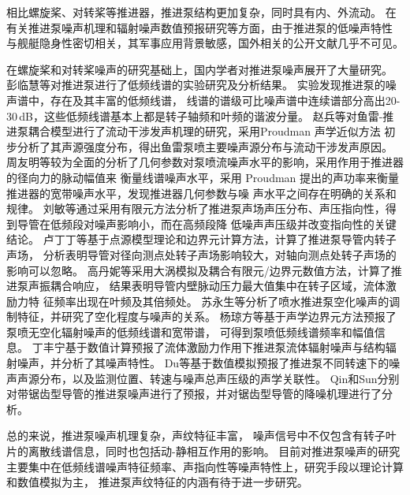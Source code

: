 相比螺旋桨、对转桨等推进器，推进泵结构更加复杂，同时具有内、外流动。
在有关推进泵噪声机理和辐射噪声数值预报研究等方面，由于推进泵的低噪声特性
与舰艇隐身性密切相关，其军事应用背景敏感，国外相关的公开文献几乎不可见。

在螺旋桨和对转桨噪声的研究基础上，国内学者对推进泵噪声展开了大量研究。
彭临慧等\cite{__1998彭临慧}对推进泵进行了低频线谱的实验研究及分析结果。
实验发现推进泵的噪声谱中，存在及其丰富的低频线谱，
线谱的谱级可比噪声谱中连续谱部分高出20-30\,dB，这些低频线谱基本上都是转子轴频和叶频的谐波分量。
赵兵等\cite{__2009赵兵}对鱼雷-推进泵耦合模型进行了流动干涉发声机理的研究，采用Proudman 声学近似方法
初步分析了其声源强度分布，得出鱼雷泵喷主要噪声源分布与流动干涉发声原因。
周友明等\cite{__2011周友明}较为全面的分析了几何参数对泵喷流噪声水平的影响，采用作用于推进器的径向力的脉动幅值来
衡量线谱噪声水平，采用 Proudman 提出的声功率来衡量推进器的宽带噪声水平，发现推进器几何参数与噪
声水平之间存在明确的关系和规律。
刘敏等\cite{__2011刘敏}通过采用有限元方法分析了推进泵声场声压分布、声压指向性，得到导管在低频段对噪声影响小，而在高频段降
低噪声声压级并改变指向性的关键结论。
卢丁丁等\cite{__2016卢丁丁}基于点源模型理论和边界元计算方法，计算了推进泵导管内转子声场，
分析表明导管对径向测点处转子声场影响较大，对轴向测点处转子声场的影响可以忽略。
高丹妮等\cite{__2018高丹妮}采用大涡模拟及耦合有限元/边界元数值方法，计算了推进泵声振耦合响应，
结果表明导管内壁脉动压力最大值集中在转子区域，流体激励力特
征频率出现在叶频及其倍频处。
苏永生等\cite{__2013苏永生}分析了喷水推进泵空化噪声的调制特征，并研究了空化程度与噪声的关系。
杨琼方等\cite{__2016杨琼方}基于声学边界元方法预报了泵喷无空化辐射噪声的低频线谱和宽带谱，
可得到泵喷低频线谱频率和幅值信息。
丁丰宁\cite{__2019于丰宁}基于数值计算预报了流体激励力作用下推进泵流体辐射噪声与结构辐射噪声，并分析了其噪声特性。
Du等\cite{duNumericalAnalysisFlow2019a}基于数值模拟预报了推进泵不同转速下的噪声声源分布，以及监测位置、转速与噪声总声压级的声学关联性。
Qin\cite{qinUnderwaterRadiatedNoise2019a}和Sun\cite{sunNumericalInvestigationNoise2019}分别对带锯齿型导管的推进泵噪声进行了预报，并对锯齿型导管的降噪机理进行了分析。

总的来说，推进泵噪声机理复杂，声纹特征丰富，
噪声信号中不仅包含有转子叶片的离散线谱信息，同时也包括动-静相互作用的影响。
目前对推进泵噪声的研究主要集中在低频线谱噪声特征频率、声指向性等噪声特性上，研究手段以理论计算和数值模拟为主，
推进泵声纹特征的内涵有待于进一步研究。


